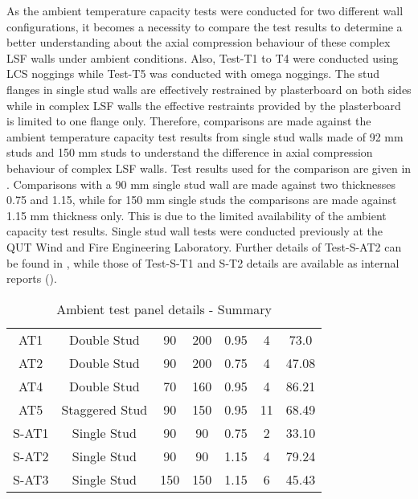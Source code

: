 As the ambient temperature capacity tests were conducted for two different wall configurations, it becomes a necessity to compare the test results to determine a better understanding about the axial compression behaviour of these complex LSF walls under ambient conditions. Also, Test-T1 to T4 were conducted using LCS noggings while Test-T5 was conducted with omega noggings. The stud flanges in single stud walls are effectively restrained by plasterboard on both sides while in complex LSF walls the effective restraints provided by the plasterboard is limited to one flange only. Therefore, comparisons are made against the ambient temperature capacity test results from single stud walls made of 92 mm studs and 150 mm studs to understand the difference in axial compression behaviour of complex LSF walls. Test results used for the comparison are given in . Comparisons with a 90 mm single stud wall are made against two thicknesses 0.75 and 1.15, while for 150 mm single studs the comparisons are made against 1.15 mm thickness only. This is due to the limited availability of the ambient capacity test results. Single stud wall tests were conducted previously at the QUT Wind and Fire Engineering Laboratory. Further details of Test-S-AT2 can be found in \citet{Gunalan2013e}, while those of Test-S-T1 and S-T2 details are available as internal reports (\cite{Anthonypeer2016}). 
\begin{table}[!htbp]
	\centering
	\caption{Ambient test panel details - Summary}
	\begin{tabular}{ccccccc}
		\toprule
		\multicolumn{1}{m{2.4em}}{\centering{Test Name}} & 
		\multicolumn{1}{m{5.6em}}{\centering{Description}} & 
		\multicolumn{1}{m{2.85em}}{\centering{Stud Depth (mm)}} & 
		\multicolumn{1}{m{2.85em}}{\centering{Cavity Depth (mm)}} & 
		\multicolumn{1}{m{5em}}{\centering{Stud Thickness (mm)}} & 
		\multicolumn{1}{m{3em}}{\centering{No of Studs}} &
		\multicolumn{1}{m{3em}}{\centering{Failure Load (kN)}} \\
		\midrule
		AT1  & Double Stud & 90 & 200 & 0.95 & 4 & 73.0 \\
		AT2  & Double Stud & 90 & 200 & 0.75 & 4 & 47.08 \\
		AT4  & Double Stud & 70 & 160 & 0.95 & 4 & 86.21 \\
		AT5  & Staggered Stud & 90 & 150 & 0.95 & 11 & 68.49 \\
		S-AT1 & Single Stud & 90 & 90 & 0.75 & 2 & 33.10 \\
		S-AT2 & Single Stud & 90 & 90 & 1.15 & 4 & 79.24 \\
		S-AT3 & Single Stud & 150 & 150 & 1.15 & 6 & 45.43 \\
		\bottomrule
	\end{tabular}%
	\label{tab:ambient-test-results-comparison}%
\end{table}%

